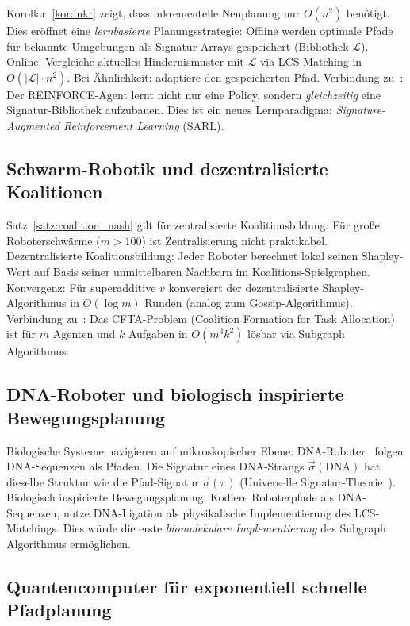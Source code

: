 ﻿\documentclass[a4paper,12pt]{article}
\theoremstyle{definition}
\begin{document}
Korollar~\ref{kor:inkr} zeigt, dass inkrementelle Neuplanung nur $O(n^2)$
ben\"otigt. Dies er\"offnet eine \emph{lernbasierte} Planungsstrategie:
Offline werden optimale Pfade f\"ur bekannte Umgebungen als Signatur-Arrays
gespeichert (Bibliothek $\mathcal{L}$).
Online: Vergleiche aktuelles Hindernismuster mit $\mathcal{L}$ via
LCS-Matching in $O(|\mathcal{L}| \cdot n^2)$.
Bei \"Ahnlichkeit: adaptiere den gespeicherten Pfad.
Verbindung zu~\cite{epp2026hetnet,epp2026robosim}:
Der REINFORCE-Agent lernt nicht nur eine Policy, sondern \emph{gleichzeitig}
eine Signatur-Bibliothek aufzubauen. Dies ist ein neues Lernparadigma:
\emph{Signature-Augmented Reinforcement Learning} (SARL).

\subsection{Schwarm-Robotik und dezentralisierte Koalitionen}

Satz~\ref{satz:coalition_nash} gilt f\"ur zentralisierte Koalitionsbildung.
F\"ur gro{\ss}e Roboterschwärme ($m > 100$) ist Zentralisierung nicht
praktikabel.
Dezentralisierte Koalitionsbildung: Jeder Roboter berechnet lokal seinen
Shapley-Wert auf Basis seiner unmittelbaren Nachbarn im Koalitions-Spielgraphen.
Konvergenz: F\"ur superadditive $v$ konvergiert der dezentralisierte
Shapley-Algorithmus in $O(\log m)$ Runden (analog zum Gossip-Algorithmus).
Verbindung zu~\cite{epp2026ecfta}: Das CFTA-Problem (Coalition Formation
for Task Allocation) ist f\"ur $m$ Agenten und $k$ Aufgaben in
$O(m^3 k^2)$ l\"osbar via Subgraph Algorithmus.

\subsection{DNA-Roboter und biologisch inspirierte Bewegungsplanung}

Biologische Systeme navigieren auf mikroskopischer Ebene: DNA-Roboter~\cite{epp2026dna}
folgen DNA-Sequenzen als Pfaden.
Die Signatur eines DNA-Strangs $\vec{\sigma}(\text{DNA})$ hat dieselbe
Struktur wie die Pfad-Signatur $\vec{\sigma}(\pi)$
(Universelle Signatur-Theorie~\cite{epp2026ust}).
Biologisch inspirierte Bewegungsplanung: Kodiere Roboterpfade als
DNA-Sequenzen, nutze DNA-Ligation als physikalische Implementierung des
LCS-Matchings.
Dies w\"urde die erste \emph{biomolekulare Implementierung} des
Subgraph Algorithmus erm\"oglichen.

\subsection{Quantencomputer f\"ur exponentiell schnelle Pfadplanung}
\end{document}

